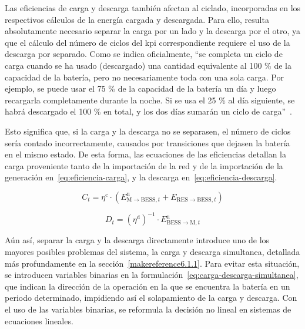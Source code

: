 Las eficiencias de carga y descarga también afectan al ciclado, incorporadas en los respectivos cálculos de la energía cargada y descargada. Para ello, resulta absolutamente necesario separar la carga por un lado y la descarga por el otro, ya que el cálculo del número de ciclos del \gls{kpi} correspondiente requiere el uso de la descarga por separado. Como se indica oficialmente, ``se completa un ciclo de carga cuando se ha usado (descargado) una cantidad equivalente al 100 \% de la capacidad de la batería, pero no necesariamente toda con una sola carga. Por ejemplo, se puede usar el 75 \% de la capacidad de la batería un día y luego recargarla completamente durante la noche. Si se usa el 25 \% al día siguiente, se habrá descargado el 100 \% en total, y los dos días sumarán un ciclo de carga''~\cite{apple2025batteries}.

Esto significa que, si la carga y la descarga no se separasen, el número de ciclos sería contado incorrectamente, causados por transiciones que dejasen la batería en el mismo estado. De esta forma, las ecuaciones de las eficiencias detallan la carga proveniente tanto de la importación de la red y de la importación de la generación en~\ref{eq:eficiencia-carga}, y la descarga en~\ref{eq:eficiencia-descarga}.

\begin{equation}%
  \label{eq:eficiencia-carga}
  C_{t} = \eta^{\mathrm{c}} \cdot (E^{\mathrm{n}}_{\mathrm{M} \rightarrow \mathrm{BESS}, t} + E_{\mathrm{RES} \rightarrow \mathrm{BESS}, t})
\end{equation}

\begin{equation}%
  \label{eq:eficiencia-descarga}
  D_{t} = {(\eta^{\mathrm{d}})}^{-1} \cdot E^{\mathrm{n}}_{\mathrm{BESS} \rightarrow \mathrm{M}, t}
\end{equation}

Aún así, separar la carga y la descarga directamente introduce uno de los mayores posibles problemas del sistema, la carga y descarga simultanea, detallada más profundamente en la sección~\ref{makereference6.1.1}. Para evitar esta situación, se introducen variables binarias en la formulación~\ref{eq:carga-descarga-simultanea}, que indican la dirección de la operación en la que se encuentra la batería en un periodo determinado, impidiendo así el solapamiento de la carga y descarga. Con el uso de las variables binarias, se reformula la decisión no lineal en sistemas de ecuaciones lineales.

